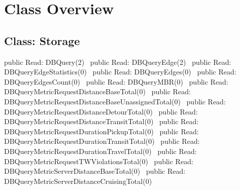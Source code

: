 \chapter*{Class Overview}
\label{overview}


\section*{Class: Storage}
\nwenddocs{}\endmoddef{}
public \LA{}Read: DBQuery(2)~{\nwtagstyle{}}\RA{}
public \LA{}Read: DBQueryEdge(2)~{\nwtagstyle{}}\RA{}
public \LA{}Read: DBQueryEdgeStatistics(0)~{\nwtagstyle{}}\RA{}
public \LA{}Read: DBQueryEdges(0)~{\nwtagstyle{}}\RA{}
public \LA{}Read: DBQueryEdgesCount(0)~{\nwtagstyle{}}\RA{}
public \LA{}Read: DBQueryMBR(0)~{\nwtagstyle{}}\RA{}
public \LA{}Read: DBQueryMetricRequestDistanceBaseTotal(0)~{\nwtagstyle{}}\RA{}
public \LA{}Read: DBQueryMetricRequestDistanceBaseUnassignedTotal(0)~{\nwtagstyle{}}\RA{}
public \LA{}Read: DBQueryMetricRequestDistanceDetourTotal(0)~{\nwtagstyle{}}\RA{}
public \LA{}Read: DBQueryMetricRequestDistanceTransitTotal(0)~{\nwtagstyle{}}\RA{}
public \LA{}Read: DBQueryMetricRequestDurationPickupTotal(0)~{\nwtagstyle{}}\RA{}
public \LA{}Read: DBQueryMetricRequestDurationTransitTotal(0)~{\nwtagstyle{}}\RA{}
public \LA{}Read: DBQueryMetricRequestDurationTravelTotal(0)~{\nwtagstyle{}}\RA{}
public \LA{}Read: DBQueryMetricRequestTWViolationsTotal(0)~{\nwtagstyle{}}\RA{}
public \LA{}Read: DBQueryMetricServerDistanceBaseTotal(0)~{\nwtagstyle{}}\RA{}
public \LA{}Read: DBQueryMetricServerDistanceCruisingTotal(0)~{\nwtagstyle{}}\RA{}
